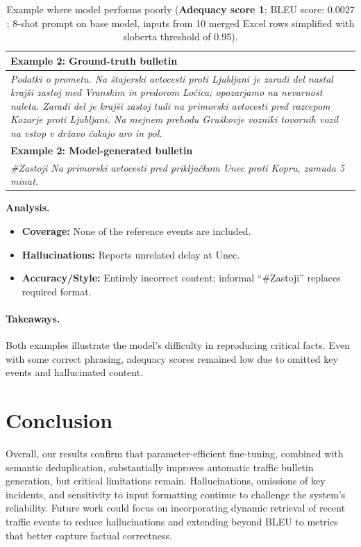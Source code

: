 \documentclass[fleqn,moreauthors,10pt]{ds_report}
\begin{document}
\vspace{1em}

\begin{table}[!ht]
\centering
\footnotesize
\renewcommand{\arraystretch}{1.15}
\setlength{\tabcolsep}{4pt}
\begin{tabularx}{\linewidth}{@{}X@{}}
\toprule
\textbf{Example 2: Ground-truth bulletin} \\
\midrule
\textit{Podatki o prometu. Na štajerski avtocesti proti Ljubljani je zaradi del nastal krajši zastoj med Vranskim in predorom Ločica; opozarjamo na nevarnost naleta. Zaradi del je krajši zastoj tudi na primorski avtocesti pred razcepom Kozarje proti Ljubljani. Na mejnem prehodu Gruškovje vozniki tovornih vozil na vstop v državo čakajo uro in pol.} \\
\midrule
\textbf{Example 2: Model-generated bulletin} \\
\midrule
\textit{\#Zastoji Na primorski avtocesti pred priključkom Unec proti Kopru, zamuda 5 minut.} \\
\bottomrule
\end{tabularx}
\caption{Example where model performs poorly (\textbf{Adequacy score 1}; BLEU score: $0.0027$; 8-shot prompt on base model, inputs from 10 merged Excel rows simplified with sloberta threshold of $0.95$).}

\end{table}

\FloatBarrier            %
\noindent \textbf{Analysis.}
\begin{itemize}[noitemsep, topsep=0pt]
  \item \textbf{Coverage:} None of the reference events are included.
  \item \textbf{Hallucinations:} Reports unrelated delay at Unec.
  \item \textbf{Accuracy/Style:} Entirely incorrect content; informal “\#Zastoji” replaces required format.
\end{itemize}

\paragraph{Takeaways.}  
Both examples illustrate the model's difficulty in reproducing critical facts. Even with some correct phrasing, adequacy scores remained low due to omitted key events and hallucinated content.

\section{Conclusion}
Overall, our results confirm that parameter-efficient fine-tuning, combined with semantic deduplication, substantially improves automatic traffic bulletin generation, but critical limitations remain. Hallucinations, omissions of key incidents, and sensitivity to input formatting continue to challenge the system's reliability. Future work could focus on incorporating dynamic retrieval of recent traffic events to reduce hallucinations and extending beyond BLEU to metrics that better capture factual correctness.
\end{document}
